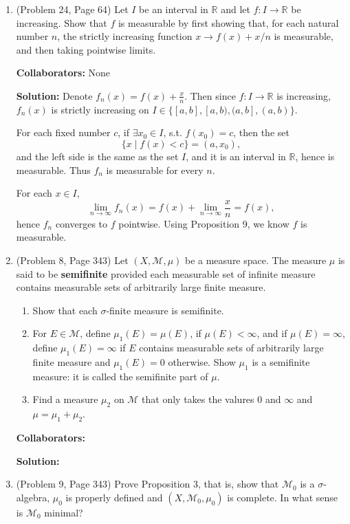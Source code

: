 \documentclass{article}%
\begin{document}
\begin{enumerate}
\item  (Problem 24, Page 64) Let $I$ be an interval in $\mathbb{R}$ and let $f:I\to \mathbb{R}$ be increasing. Show that $f$ is measurable by first showing that, for each natural number $n$, the strictly increasing function $x\to f(x)+x/n$ is measurable, and then taking pointwise limits.


\bigskip
\textbf{Collaborators:} None\\
\smallskip
 
\textbf{Solution:}
Denote $f_{n}(x) = f(x)+\frac{x}{n}$. Then since $f: I \to \mathbb{R}$ is increasing, $f_n(x)$ is strictly increasing on $I \in \{[a, b], [a, b), (a, b], (a, b)\}$.

For each fixed number $c$, if $\exists x_0\in I$, s.t. $f(x_0) = c$, then the set
$$
\{x\mid f(x) < c\} = (a, x_0),
$$
and the left side is the same as the set $I$, and it is an interval in $\mathbb{R}$, hence is measurable. Thus $f_{n}$ is measurable for every $n$. 

For each $x\in I$, 
$$
\lim_{n\to\infty}f_n(x) = f(x)+\lim_{n\to\infty}\frac{x}{n} = f(x),
$$
hence $f_{n}$ converges to $f$ pointwise. Using Proposition 9, we know $f$ is measurable.
\bigskip

\item (Problem 8, Page 343)  Let $(X,\mathcal{M}, \mu)$ be a measure space.  The measure $\mu$ is said to be \textbf{semifinite} provided each measurable set of infinite measure contains measurable sets of arbitrarily large finite measure.
\begin{enumerate}
\item Show that each $\sigma$-finite measure is semifinite.
\item For $E\in \mathcal{M}$, define $\mu_1(E) = \mu(E)$, if $\mu(E)<\infty$, and if $\mu(E)=\infty$, define $\mu_1(E)=\infty$ if $E$ contains measurable sets of arbitrarily large finite measure and $\mu_1(E)= 0$ otherwise.  Show $\mu_1$ is a semifinite measure: it is called the semifinite part of $\mu$.
\item Find a measure $\mu_2$ on $\mathcal{M}$ that only takes the valures $0$ and $\infty$ and $\mu = \mu_1 + \mu_2$.
\end{enumerate} 


\bigskip
\textbf{Collaborators:}\\
\smallskip
 
\textbf{Solution:}
\bigskip


\item (Problem 9, Page 343) Prove Proposition 3, that is, show that $\mathcal{M}_0$ is a $\sigma$-algebra, $\mu_0$ is properly defined and $(X,\mathcal{M}_0, \mu_0)$ is complete.  In what sense is $\mathcal{M}_0$ minimal?



\end{enumerate}
\end{document}
